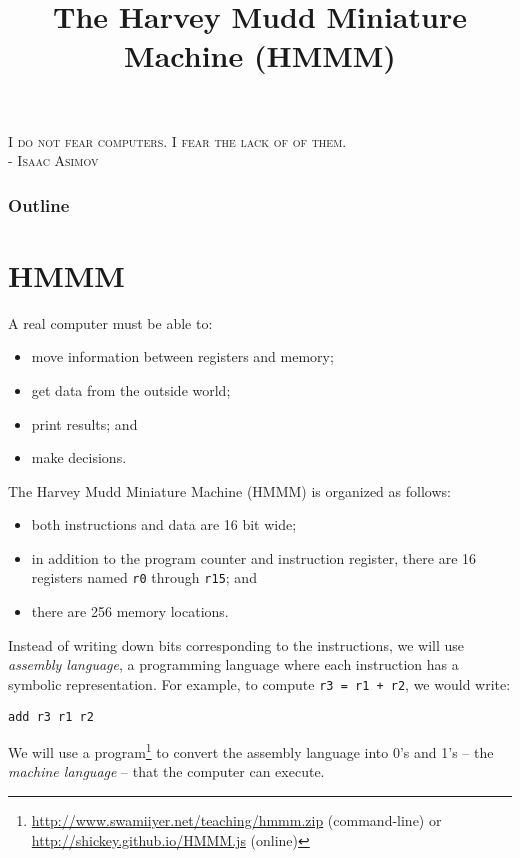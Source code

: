 \documentclass[8pt,a4paper,compress,handout]{beamer}
\title{The Harvey Mudd Miniature Machine (HMMM)}
\date{}
\begin{document}
\begin{frame}
\begin{flushright}
\tiny \textsc{I do not fear computers. I fear the lack of of them. \\ - Isaac Asimov}
\end{flushright}
\titlepage
\end{frame}

\begin{frame}
\frametitle{Outline}
\tableofcontents
\end{frame}

\section{HMMM}
\begin{frame}[fragile]
A real computer must be able to:
\begin{itemize}
\item move information between registers and memory;  
\item get data from the outside world;  
\item print results; and 
\item make decisions.
\end{itemize}

\bigskip

The Harvey Mudd Miniature Machine (HMMM) is organized as follows:
\begin{itemize}
\item both instructions and data are 16 bit wide; 
\item in addition to the program counter and instruction register, there are 16 registers named \lstinline{r0} through \lstinline{r15}; and 
\item there are 256 memory locations.
\end{itemize}

\bigskip

Instead of writing down bits corresponding to the instructions, we will use \emph{assembly language}, a programming language where each instruction has a symbolic representation. For example, to compute \lstinline{r3 = r1 + r2}, we would write:

\begin{lstlisting}[language={}]
add r3 r1 r2
\end{lstlisting}

\bigskip

We will use a program\footnote{\href{http://www.swamiiyer.net/teaching/hmmm.zip}{http://www.swamiiyer.net/teaching/hmmm.zip} (command-line) or \href{http://shickey.github.io/HMMM.js}{http://shickey.github.io/HMMM.js} (online)} to convert the assembly language into 0's and 1's -- the \emph{machine language} -- that the computer can execute.
\end{frame}
\end{document}

